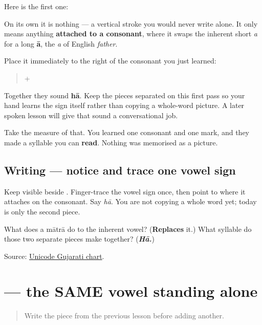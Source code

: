 Here is the first one:

\begin{quote}
\end{quote}

On its own it is nothing — a vertical stroke you would never write alone. It only means anything \textbf{attached to a consonant}, where it swaps the inherent short \emph{a} for a long \textbf{ā}, the \emph{a} of English \emph{father}.

Place it immediately to the right of the consonant you just learned:

\begin{quote}
\textbf{} + \textbf{}
\end{quote}

Together they sound \textbf{hā}. Keep the pieces separated on this first pass so your hand learns the sign itself rather than copying a whole-word picture. A later spoken lesson will give that sound a conversational job.

Take the measure of that. You learned one consonant and one mark, and they made a syllable you can \textbf{read}. Nothing was memorised as a picture.

\subsection*{Writing — notice and trace one vowel sign}
Keep \textbf{} visible beside \textbf{}. Finger-trace the vowel sign once, then point to where it attaches on the consonant. Say \emph{hā}. You are not copying a whole word yet; today is only the second piece.

\begin{tcolorbox}[breakable,colback=teal!4,colframe=teal!35!black,title={Before you move on}]
What does a mātrā do to the inherent vowel? (\textbf{Replaces} it.) What syllable do those two separate pieces make together? (\emph{\textbf{Hā.}})

Source: \href{https://www.unicode.org/charts/PDF/U0A80.pdf}{Unicode Gujarati chart}.
\end{tcolorbox}
\section[ā]{ — the SAME vowel standing alone}

\label{lesson:GU-W01-aa}



\begin{quote}
Write the piece from the previous lesson before adding another.
\end{quote}

